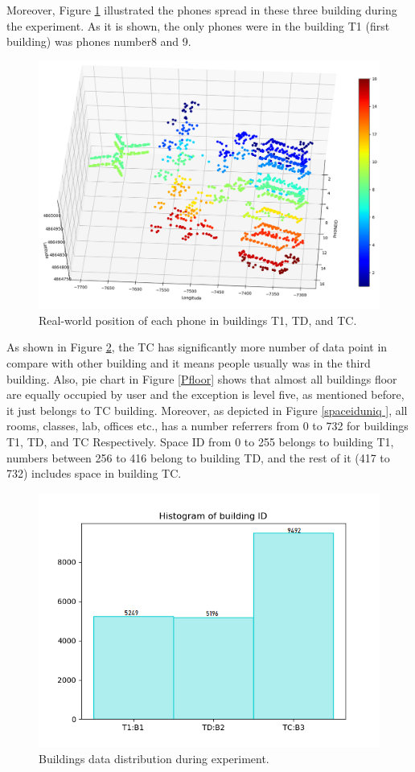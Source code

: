 Moreover, Figure \ref{phoneall} illustrated the phones spread in these three building during the experiment. As it is shown, the only phones were in the building T1 (first building) was phones number8 and 9. 


\begin{figure}
    \centering
    \includegraphics[width = 10 cm]{image/Chapters/Chapter6/LatLongUser.png}
    \caption{Real-world position of each phone in buildings T1, TD, and TC.}
    \label{phoneall}
\end{figure}





As shown in Figure \ref{bdd}, the TC has significantly more number of data point in compare with other building  and it means people usually was in the third building. Also, pie chart in Figure \ref{Pfloor} shows that almost all buildings floor are equally occupied by user and the exception is level five, as mentioned before, it just belongs to TC building. Moreover, as depicted in Figure \ref{spaceiduniq }, all rooms, classes, lab, offices etc., has a number referrers from 0 to 732 for  buildings T1, TD, and TC Respectively. Space ID from 0 to 255 belongs to building T1, numbers between 256 to 416 belong to building TD, and the rest of it (417 to 732) includes space in building TC.



\begin{figure}
    \centering
    \includegraphics[width = 12 cm]{image/Chapters/Chapter6/buidlingID.png}
    \caption{Buildings data distribution during experiment. }
    \label{bdd}
\end{figure}




